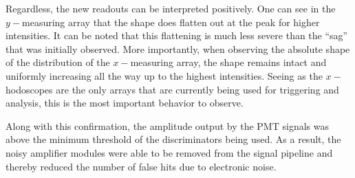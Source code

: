 Regardless, the new readouts can be interpreted positively. One can see in the $y-$measuring array that the shape does flatten out at the peak for higher intensities. It can be noted that this flattening is much less severe than the ``sag'' that was initially observed. More importantly, when observing the absolute shape of the distribution of the $x-$measuring array, the shape remains intact and uniformly increasing all the way up to the highest intensities. Seeing as the $x-$hodoscopes are the only arrays that are currently being used for triggering and analysis, this is the most important behavior to observe. 

Along with this confirmation, the amplitude output by the PMT signals was above the minimum threshold of the discriminators being used. As a result, the noisy amplifier modules were able to be removed from the signal pipeline and thereby reduced the number of false hits due to electronic noise.